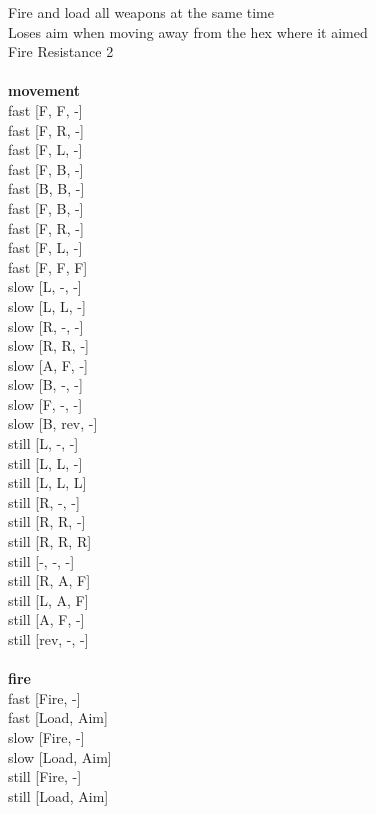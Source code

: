 \noindent Fire and load all weapons at the same time\\ 
Loses aim when moving away from the hex where it aimed\\ 
Fire Resistance 2\\ 


\ \\ {\bf movement } \\
fast [F, F, -] \\
fast [F, R, -] \\
fast [F, L, -] \\
fast [F, B, -] \\
fast [B, B, -] \\
fast [F, B, -] \\
fast [F, R, -] \\
fast [F, L, -] \\
fast [F, F, F] \\
slow [L, -, -] \\
slow [L, L, -] \\
slow [R, -, -] \\
slow [R, R, -] \\
slow [A, F, -] \\
slow [B, -, -] \\
slow [F, -, -] \\
slow [B, rev, -] \\
still [L, -, -] \\
still [L, L, -] \\
still [L, L, L] \\
still [R, -, -] \\
still [R, R, -] \\
still [R, R, R] \\
still [-, -, -] \\
still [R, A, F] \\
still [L, A, F] \\
still [A, F, -] \\
still [rev, -, -] \\
\ \\ {\bf fire } \\
fast [Fire, -] \\
fast [Load, Aim] \\
slow [Fire, -] \\
slow [Load, Aim] \\
still [Fire, -] \\
still [Load, Aim] \\


